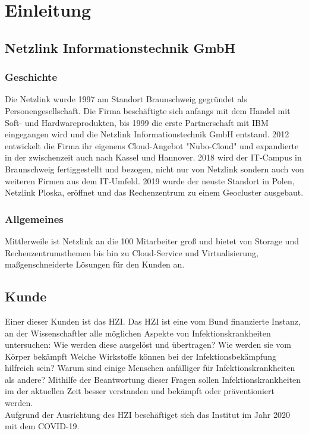 \chapter{Einleitung}

\section{Netzlink Informationstechnik GmbH}

\subsection{Geschichte} 
Die Netzlink wurde 1997 am Standort Braunschweig gegründet als Personengesellschaft. 
Die Firma beschäftigte sich anfangs mit dem Handel mit Soft- und Hardwareprodukten, bis 1999 die erste Partnerschaft mit IBM eingegangen wird und die Netzlink Informationstechnik GmbH entstand.
2012 entwickelt die Firma ihr eigenens Cloud-Angebot "Nubo-Cloud" und expandierte in der zwischenzeit auch nach Kassel und Hannover. 
2018 wird der IT-Campus in Braunschweig fertiggestellt und bezogen, nicht nur von Netzlink sondern auch von weiteren Firmen aus dem IT-Umfeld. 
2019 wurde der neuste Standort in Polen, Netzlink Ploska, eröffnet und das Rechenzentrum zu einem Geocluster ausgebaut. 
\cite{Netzlink_history}

\subsection{Allgemeines}
Mittlerweile ist Netzlink an die 100 Mitarbeiter groß und bietet von Storage und Rechenzentrumsthemen bis hin zu Cloud-Service und Virtualisierung, maßgenschneiderte Lösungen für den Kunden an.
\cite{Netzlink_history}



\section{Kunde}
Einer dieser Kunden ist das \ac{HZI}.
Das \ac{HZI} ist eine vom Bund finanzierte Instanz, an der Wissenschaftler alle möglichen Aspekte von Infektionskrankheiten untersuchen:
Wie werden diese ausgelöst und übertragen?
Wie werden sie vom Körper bekämpft
Welche Wirkstoffe können bei der Infektionsbekämpfung hilfreich sein?
Warum sind einige Menschen anfälliger für Infektionskrankheiten als andere?
Mithilfe der Beantwortung dieser Fragen sollen Infektionskrankheiten im der aktuellen Zeit besser verstanden und bekämpft oder präventioniert werden. 
\cite{HZI_about}
\\
Aufgrund der Ausrichtung des \ac{HZI} beschäftiget sich das Institut im Jahr 2020 mit dem \ac{COVID-19}.

